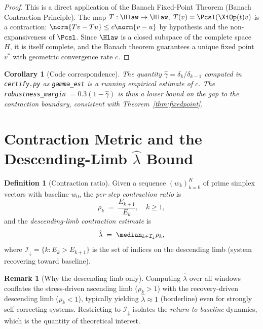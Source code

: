 \documentclass[12pt,a4paper]{article}
\theoremstyle{plain}
\newtheorem{corollary}[theorem]{Corollary}
\theoremstyle{definition}
\newtheorem{definition}[theorem]{Definition}
\newtheorem{remark}[theorem]{Remark}
\begin{document}
\begin{proof}
  This is a direct application of the Banach Fixed-Point Theorem
  (Banach Contraction Principle).  The map
  $T:\Hlaw\to\Hlaw,\; T(v) = \Pcsl(\XiOp(t)v)$
  is a contraction: $\norm{Tv - Tu}\le c\norm{v-u}$ by hypothesis
  and the non-expansiveness of $\Pcsl$.  Since $\Hlaw$ is a closed subspace
  of the complete space $H$, it is itself complete, and the Banach theorem
  guarantees a unique fixed point $v^*$ with geometric convergence rate $c$.
\end{proof}

\begin{corollary}[Code correspondence]
  The quantity $\hat\gamma = \delta_k/\delta_{k-1}$ computed in
  \texttt{certify.py} as \texttt{gamma\_est} is a running empirical
  estimate of $c$.  The \texttt{robustness\_margin} $= 0.3(1-\hat\gamma)$
  is thus a lower bound on the gap to the contraction boundary, consistent
  with Theorem~\ref{thm:fixedpoint}.
\end{corollary}

\section{Contraction Metric and the Descending-Limb $\hat\lambda$ Bound}
\label{sec:lambda}

\begin{definition}[Contraction ratio]
  \label{def:lambda}
  Given a sequence $(w_k)_{k=0}^{K}$ of prime simplex vectors with
  baseline $w_0$, the \emph{per-step contraction ratio} is
  \[
    \rho_k \;=\; \frac{E_{k+1}}{E_k}, \quad k\ge 1,
  \]
  and the \emph{descending-limb contraction estimate} is
  \[
    \hat\lambda \;=\; \median_{k\in\mathcal{I}_\downarrow} \rho_k,
  \]
  where $\mathcal{I}_\downarrow = \{k : E_k > E_{k+1}\}$ is the set of
  indices on the descending limb (system recovering toward baseline).
\end{definition}

\begin{remark}[Why the descending limb only]
  Computing $\hat\lambda$ over all windows conflates the stress-driven
  ascending limb ($\rho_k > 1$) with the recovery-driven descending limb
  ($\rho_k < 1$), typically yielding $\hat\lambda\approx 1$ (borderline)
  even for strongly self-correcting systems.  Restricting to
  $\mathcal{I}_\downarrow$ isolates the \emph{return-to-baseline} dynamics,
  which is the quantity of theoretical interest.
\end{remark}
\end{document}
